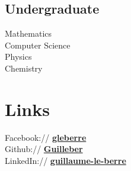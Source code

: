\documentclass[]{deedy-resume-openfont}
\begin{document}
\begin{minipage}[t]{0.29\textwidth}
\subsection{Undergraduate}
Mathematics \\
Computer Science \\
Physics \\
Chemistry \\


\section{Links} 
Facebook:// \href{https://facebook/gleberre}{\bf gleberre} \\
Github:// \href{https://github.com/Guilleber}{\bf Guilleber} \\
LinkedIn://  \href{https://www.linkedin.com/in/guillaume-le-berre}{\bf guillaume-le-berre} \\

%
%

\end{minipage} 
\hfill
\end{document}
